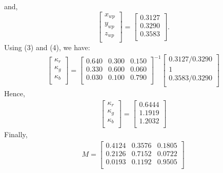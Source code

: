 \documentclass{article}
\begin{document}
	and,
	\begin{equation}
		\begin{bmatrix}
		x_{wp} \\
		y_{wp} \\
		z_{wp} \\
		\end{bmatrix}
		=
		\begin{bmatrix}
		0.3127 \\
		0.3290 \\
		0.3583 \\
		\end{bmatrix}
		.
	\end{equation}
	Using (3) and (4), we have:
	\begin{align*}
		\begin{bmatrix}
		\kappa_r \\
		\kappa_g \\
		\kappa_b \\
		\end{bmatrix}
		=
		\begin{bmatrix}
		0.640 & 0.300 & 0.150 \\
		0.330 & 0.600 & 0.060 \\
		0.030 & 0.100 & 0.790 \\
		\end{bmatrix}
		^{-1}
		\begin{bmatrix}
		0.3127/0.3290 \\
		1 \\
		0.3583/0.3290 \\
		\end{bmatrix}
	\end{align*}
	Hence,
	\begin{align*}
		\begin{bmatrix}
		\kappa_r \\
		\kappa_g \\
		\kappa_b \\
		\end{bmatrix}
		=
		\begin{bmatrix}
		0.6444 \\
		1.1919 \\
		1.2032 \\
		\end{bmatrix}
	\end{align*}
	Finally,
	\begin{align*}
		M =
		\begin{bmatrix}
		0.4124 & 0.3576 & 0.1805 \\
		0.2126 & 0.7152 & 0.0722 \\
		0.0193 & 0.1192 & 0.9505 \\
		\end{bmatrix}
	\end{align*}
\end{document}

